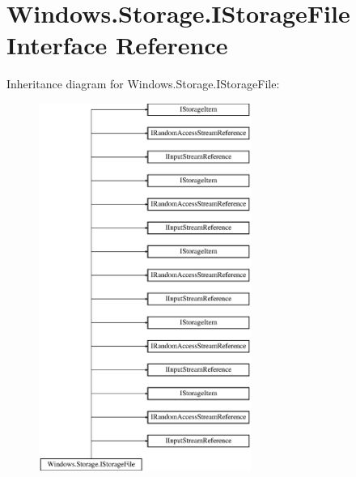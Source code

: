 \hypertarget{interface_windows_1_1_storage_1_1_i_storage_file}{}\section{Windows.\+Storage.\+I\+Storage\+File Interface Reference}
\label{interface_windows_1_1_storage_1_1_i_storage_file}
Inheritance diagram for Windows.\+Storage.\+I\+Storage\+File\+:\begin{figure}[H]
\begin{center}
\leavevmode
\includegraphics[height=12.000000cm]{interface_windows_1_1_storage_1_1_i_storage_file}
\end{center}
\end{figure}
